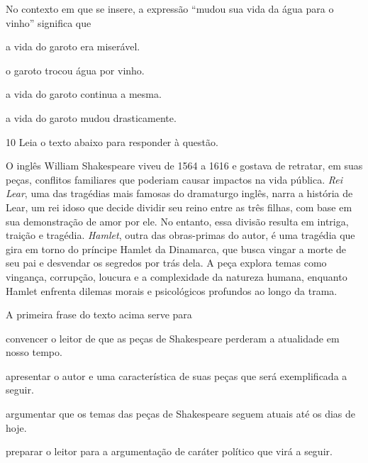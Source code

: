 No contexto em que se insere, a expressão ``mudou sua vida da água para o vinho''
significa que 

\begin{escolha}

    \item a vida do garoto era miserável.

    \item o garoto trocou água por vinho.

    \item a vida do garoto continua a mesma.

    \item a vida do garoto mudou drasticamente.

\end{escolha}

\num{10} Leia o texto abaixo para responder à questão.

\begin{myquote}

O inglês William Shakespeare viveu de 1564 a 1616 e gostava de retratar, em
suas peças, conflitos familiares que poderiam causar impactos na vida pública.
\textit{Rei Lear}, uma das tragédias mais famosas do dramaturgo inglês, narra a
história de Lear, um rei idoso que decide dividir seu reino entre as três
filhas, com base em sua demonstração de amor por ele. No entanto, essa divisão
resulta em intriga, traição e tragédia. \textit{Hamlet}, outra das obras-primas do
autor, é uma tragédia que gira em torno do príncipe Hamlet da Dinamarca, que
busca vingar a morte de seu pai e desvendar os segredos por trás dela. A peça
explora temas como vingança, corrupção, loucura e a complexidade da natureza
humana, enquanto Hamlet enfrenta dilemas morais e psicológicos profundos ao
longo da trama.


\end{myquote}


A primeira frase do texto acima serve para  

\begin{escolha}
    
    \item convencer o leitor de que as peças de Shakespeare perderam a atualidade em nosso tempo.  
    
    \item apresentar o autor e uma característica de suas peças que será exemplificada a seguir.
    
    \item argumentar que os temas das peças de Shakespeare seguem atuais até os dias de hoje. 
    
    \item preparar o leitor para a argumentação de caráter político que virá a seguir. 

\end{escolha}

